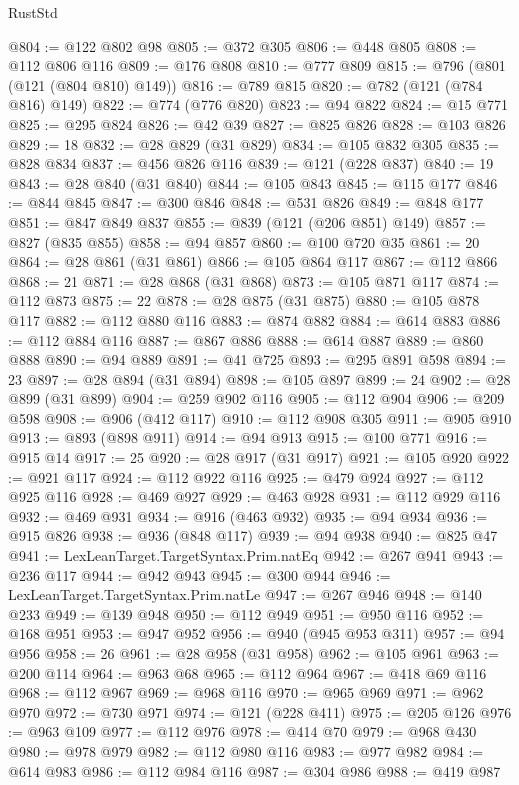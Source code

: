 \begin{lexlean}{RustStd}
\begin{coremodule}
{\begin{coremodule}
{{{{{{{{{{{{{{{{{{{{{{{{{{{{{{{{{{{{{{{{{{{{@804 := @122 @802 @98
@805 := @372 @305
@806 := @448 @805
@808 := @112 @806 @116
@809 := @176 @808
@810 := @777 @809
@815 := @796 (@801 (@121 (@804 @810) @149))
@816 := @789 @815
@820 := @782 (@121 (@784 @816) @149)
@822 := @774 (@776 @820)
@823 := @94 @822
@824 := @15 @771
@825 := @295 @824
@826 := @42 @39
@827 := @825 @826
@828 := @103 @826
@829 := 18
@832 := @28 @829 (@31 @829)
@834 := @105 @832 @305
@835 := @828 @834
@837 := @456 @826 @116
@839 := @121 (@228 @837)
@840 := 19
@843 := @28 @840 (@31 @840)
@844 := @105 @843
@845 := @115 @177
@846 := @844 @845
@847 := @300 @846
@848 := @531 @826
@849 := @848 @177
@851 := @847 @849 @837
@855 := @839 (@121 (@206 @851) @149)
@857 := @827 (@835 @855)
@858 := @94 @857
@860 := @100 @720 @35
@861 := 20
@864 := @28 @861 (@31 @861)
@866 := @105 @864 @117
@867 := @112 @866
@868 := 21
@871 := @28 @868 (@31 @868)
@873 := @105 @871 @117
@874 := @112 @873
@875 := 22
@878 := @28 @875 (@31 @875)
@880 := @105 @878 @117
@882 := @112 @880 @116
@883 := @874 @882
@884 := @614 @883
@886 := @112 @884 @116
@887 := @867 @886
@888 := @614 @887
@889 := @860 @888
@890 := @94 @889
@891 := @41 @725
@893 := @295 @891 @598
@894 := 23
@897 := @28 @894 (@31 @894)
@898 := @105 @897
@899 := 24
@902 := @28 @899 (@31 @899)
@904 := @259 @902 @116
@905 := @112 @904
@906 := @209 @598
@908 := @906 (@412 @117)
@910 := @112 @908 @305
@911 := @905 @910
@913 := @893 (@898 @911)
@914 := @94 @913
@915 := @100 @771
@916 := @915 @14
@917 := 25
@920 := @28 @917 (@31 @917)
@921 := @105 @920
@922 := @921 @117
@924 := @112 @922 @116
@925 := @479 @924
@927 := @112 @925 @116
@928 := @469 @927
@929 := @463 @928
@931 := @112 @929 @116
@932 := @469 @931
@934 := @916 (@463 @932)
@935 := @94 @934
@936 := @915 @826
@938 := @936 (@848 @117)
@939 := @94 @938
@940 := @825 @47
@941 := LexLeanTarget.TargetSyntax.Prim.natEq
@942 := @267 @941
@943 := @236 @117
@944 := @942 @943
@945 := @300 @944
@946 := LexLeanTarget.TargetSyntax.Prim.natLe
@947 := @267 @946
@948 := @140 @233
@949 := @139 @948
@950 := @112 @949
@951 := @950 @116
@952 := @168 @951
@953 := @947 @952
@956 := @940 (@945 @953 @311)
@957 := @94 @956
@958 := 26
@961 := @28 @958 (@31 @958)
@962 := @105 @961
@963 := @200 @114
@964 := @963 @68
@965 := @112 @964
@967 := @418 @69 @116
@968 := @112 @967
@969 := @968 @116
@970 := @965 @969
@971 := @962 @970
@972 := @730 @971
@974 := @121 (@228 @411)
@975 := @205 @126
@976 := @963 @109
@977 := @112 @976
@978 := @414 @70
@979 := @968 @430
@980 := @978 @979
@982 := @112 @980 @116
@983 := @977 @982
@984 := @614 @983
@986 := @112 @984 @116
@987 := @304 @986
@988 := @419 @987
}}}}}}}}}}}}}}}}}}}}}}}}}}}}}}}}}}}}}}}}}}}}
\end{coremodule}}
\end{coremodule}
\end{lexlean}
